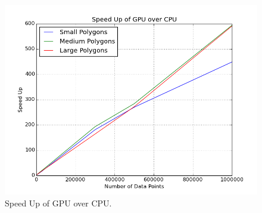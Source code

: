 \begin{figure}[H]
\centering
\vspace{0.5in}
\includegraphics[scale=0.5]{Images/SpeedUp}
\vspace{0.5in}
\caption{Speed Up of GPU over CPU.}
\label{fig:SpeedUp}
\end{figure}


